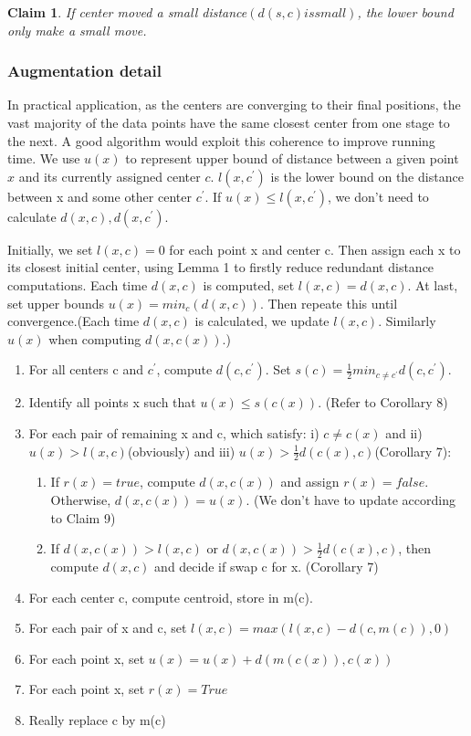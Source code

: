 \documentclass[11pt]{article}
\newtheorem{claim}[theorem]{Claim}
\begin{document}
\begin{claim}
If center moved a small distance$(d(s,c) is small)$, the lower bound only make a small move.
\end{claim}

\subsubsection{Augmentation detail}
In practical application, as the centers are converging to their final positions, the vast majority of the data points have the same closest center from one stage to the next. A good algorithm would exploit this coherence to improve running time. We use $u(x)$ to represent upper bound of distance between a given point $x$ and its currently assigned center $c$. $l(x,c^{\prime})$ is the lower bound on the distance between x and some other center $c^{\prime}$. If $u(x) \le l(x,c^{\prime}) $, we don't need to calculate $d(x,c), d(x, c^{\prime})$. \par
Initially, we set $l(x,c)=0$ for each point x and center c. Then assign each x to its closest initial center, using Lemma 1 to firstly reduce redundant distance computations. Each time $d(x,c)$ is computed, set $l(x,c)=d(x,c)$. At last, set upper bounds $u(x) = min_c(d(x,c))$. Then repeate this until convergence.(Each time $d(x,c)$ is calculated, we update $l(x,c)$. Similarly $u(x)$ when computing $d(x,c(x))$.)

\begin{enumerate}
\item For all centers c and $c^{\prime}$, compute $d(c, c^{\prime})$. Set $s(c) = \frac{1}{2}min_{c \ne c^{\prime}}d(c,c^{\prime})$.
\item Identify all points x such that $u(x) \le s(c(x))$. (Refer to Corollary 8)
\item For each pair of remaining x and c, which satisfy: i) $c \ne c(x)$ and ii) $u(x) > l(x,c)$(obviously) and iii) $u(x) > \frac{1}{2}d(c(x), c)$(Corollary 7): 
\begin{enumerate}
\item If $r(x) = true$, compute $d(x,c(x))$ and assign $r(x)=false$. Otherwise, $d(x,c(x)) = u(x).$ (We don't have to update according to Claim 9)
\item  If $d(x,c(x))> l(x,c)$ or $d(x,c(x)) > \frac{1}{2}d(c(x), c)$, then compute $d(x,c)$ and decide if swap c for x. (Corollary 7)
\end{enumerate}
\item For each center c, compute centroid, store in m(c).
\item For each  pair of x and c, set $l(x,c) = max(l(x,c) - d(c,m(c)), 0)$
\item For each point x, set $u(x) = u(x) + d(m(c(x)), c(x))$
\item For each point x, set $r(x) = True$
\item Really replace c by m(c)
\end{enumerate}
\end{document}
